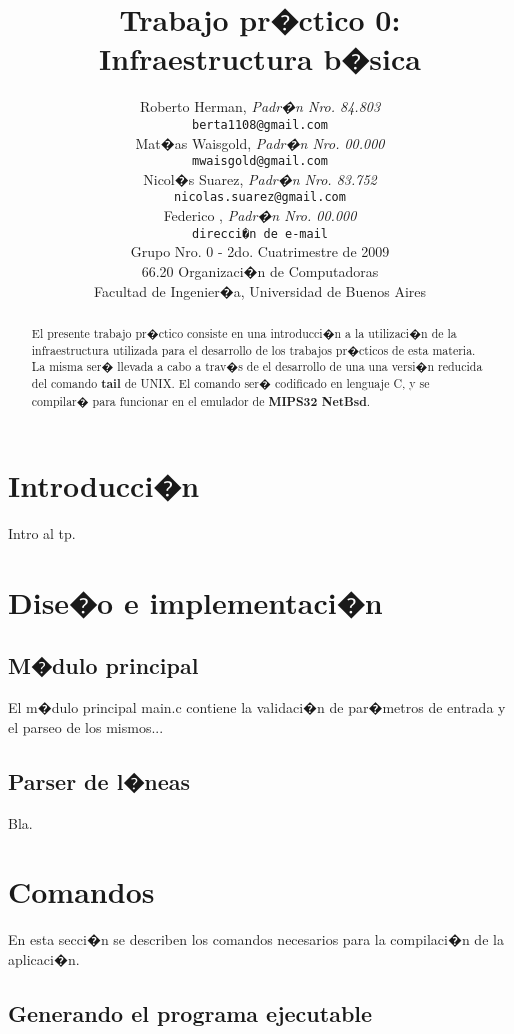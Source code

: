 \documentclass[a4paper,10pt]{article}
\title{		\textbf{Trabajo pr�ctico 0: Infraestructura b�sica}}
\author{		Roberto Herman, \textit{Padr�n Nro. 84.803}                     \\
            \texttt{ berta1108@gmail.com }                                              \\
            Mat�as Waisgold, \textit{Padr�n Nro. 00.000}                     \\
            \texttt{ mwaisgold@gmail.com }                                              \\
            Nicol�s Suarez, \textit{Padr�n Nro. 83.752}                     \\
            \texttt{ nicolas.suarez@gmail.com }                                              \\
            Federico , \textit{Padr�n Nro. 00.000}                     \\
            \texttt{ direcci�n de e-mail }                                              \\[2.5ex]
            \normalsize{Grupo Nro. 0 - 2do. Cuatrimestre de 2009}                       \\
            \normalsize{66.20 Organizaci�n de Computadoras}                             \\
            \normalsize{Facultad de Ingenier�a, Universidad de Buenos Aires}            \\
       }
\date{}
\begin{document}
\maketitle

\thispagestyle{empty}

\begin{abstract}
El presente trabajo pr�ctico consiste en una introducci�n a la utilizaci�n de la infraestructura utilizada para el desarrollo de los trabajos pr�cticos de esta materia. La misma ser� llevada a cabo a trav�s de el desarrollo de una una versi�n reducida del comando \textbf{tail} de UNIX. El comando ser� codificado en lenguaje C, y se compilar� para funcionar en el emulador de \textbf{MIPS32 NetBsd}.
\end{abstract}


\section{Introducci�n}

Intro al tp.


\section{Dise�o e implementaci�n}

\subsection{M�dulo principal}

El m�dulo principal main.c contiene la validaci�n de par�metros de entrada
y el parseo de los mismos...

\subsection{Parser de l�neas}

Bla.

\section{Comandos}

En esta secci�n se describen los comandos necesarios para la compilaci�n de
la aplicaci�n.

\subsection{Generando el programa ejecutable}
\end{document}
